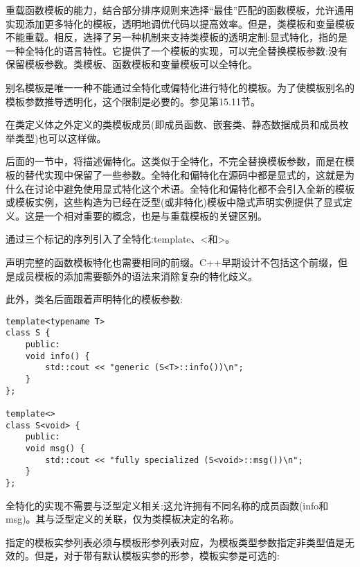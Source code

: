 
重载函数模板的能力，结合部分排序规则来选择“最佳”匹配的函数模板，允许通用实现添加更多特化的模板，透明地调优代码以提高效率。但是，类模板和变量模板不能重载。相反，选择了另一种机制来支持类模板的透明定制:显式特化，指的是一种全特化的语言特性。它提供了一个模板的实现，可以完全替换模板参数:没有保留模板参数。类模板、函数模板和变量模板可以全特化。

\begin{tcolorbox}[colback=webgreen!5!white,colframe=webgreen!75!black]
\hspace*{0.75cm}别名模板是唯一一种不能通过全特化或偏特化进行特化的模板。为了使模板别名的模板参数推导透明化，这个限制是必要的。参见第15.11节。
\end{tcolorbox}

在类定义体之外定义的类模板成员(即成员函数、嵌套类、静态数据成员和成员枚举类型)也可以这样做。

后面的一节中，将描述偏特化。这类似于全特化，不完全替换模板参数，而是在模板的替代实现中保留了一些参数。全特化和偏特化在源码中都是显式的，这就是为什么在讨论中避免使用显式特化这个术语。全特化和偏特化都不会引入全新的模板或模板实例，这些构造为已经在泛型(或非特化)模板中隐式声明实例提供了显式定义。这是一个相对重要的概念，也是与重载模板的关键区别。


通过三个标记的序列引入了全特化:template、<和>。

\begin{tcolorbox}[colback=webgreen!5!white,colframe=webgreen!75!black]
\hspace*{0.75cm}声明完整的函数模板特化也需要相同的前缀。C++早期设计不包括这个前缀，但是成员模板的添加需要额外的语法来消除复杂的特化歧义。
\end{tcolorbox}

此外，类名后面跟着声明特化的模板参数:

\begin{lstlisting}[style=styleCXX]
template<typename T>
class S {
	public:
	void info() {
		std::cout << "generic (S<T>::info())\n";
	}
};

template<>
class S<void> {
	public:
	void msg() {
		std::cout << "fully specialized (S<void>::msg())\n";
	}
};
\end{lstlisting}

全特化的实现不需要与泛型定义相关:这允许拥有不同名称的成员函数(info和msg)。其与泛型定义的关联，仅为类模板决定的名称。

指定的模板实参列表必须与模板形参列表对应，为模板类型参数指定非类型值是无效的。但是，对于带有默认模板实参的形参，模板实参是可选的:

